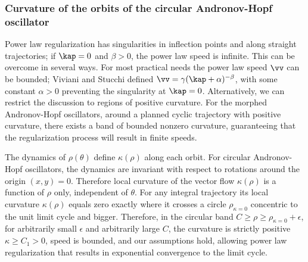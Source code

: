 \subsubsection{Curvature of the orbits of the circular Andronov-Hopf oscillator}
Power law regularization has singularities in inflection points and along straight trajectories; if $\kap=0$ and $\beta>0$, the power law speed is infinite. This can be overcome in several ways. For most practical needs the power law speed $\vv$ can be bounded; Viviani and Stucchi \cite{viviani_biological_1992} defined $\vv = \gamma (\kap+\alpha)^{-\beta}$, with some constant $\alpha>0$ preventing the singularity at $\kap=0$. Alternatively, we can restrict the discussion to regions of positive curvature. For the morphed Andronov-Hopf oscillators, around a planned cyclic trajectory with positive curvature, there exists a band of bounded nonzero curvature, guaranteeing that the regularization process will result in finite speeds. 

The dynamics of $\rho(\theta)$ define $\kappa(\rho)$ along each orbit. For circular Andronov-Hopf oscillators, the dynamics are invariant with respect to rotations around the origin $(x,y)=0$. Therefore local curvature of the vector flow $\kappa(\rho)$ is a function of $\rho$ only, independent of $\theta$. For any integral trajectory its local curvature $\kappa(\rho)$ equals zero exactly where it crosses a circle $\rho_{\kappa=0}$ concentric to the unit limit cycle and bigger. Therefore, in the circular band $C\geq\rho\geq \rho_{\kappa=0}+\epsilon$, for arbitrarily small $\epsilon$ and arbitrarily large $C$, the curvature is strictly positive $\kappa\geq C_1>0$, speed is bounded, and our assumptions hold, allowing power law regularization that results in exponential convergence to the limit cycle. 


